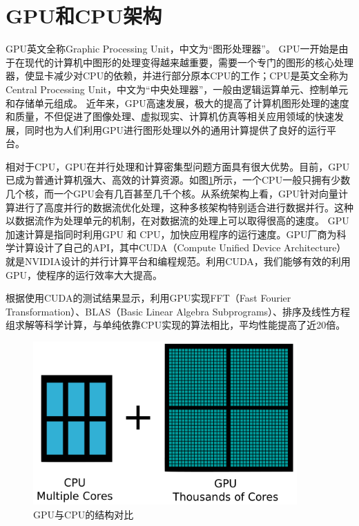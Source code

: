 {\section{GPU和CPU架构}            \label{section:GPU_CPU}
GPU英文全称Graphic Processing Unit，中文为“图形处理器”。
GPU一开始是由于在现代的计算机中图形的处理变得越来越重要，需要一个专门的图形的核心处理器，使显卡减少对CPU的依赖，并进行部分原本CPU的工作；CPU是英文全称为Central Processing Unit，中文为“中央处理器”，一般由逻辑运算单元、控制单元和存储单元组成。
近年来，GPU高速发展，极大的提高了计算机图形处理的速度和质量，不但促进了图像处理、虚拟现实、计算机仿真等相关应用领域的快速发展，同时也为人们利用GPU进行图形处理以外的通用计算提供了良好的运行平台。

相对于CPU，GPU在并行处理和计算密集型问题方面具有很大优势。目前，GPU已成为普通计算机强大、高效的计算资源。如图\ref{fig:GPU}所示，一个CPU一般只拥有少数几个核，而一个GPU会有几百甚至几千个核。从系统架构上看，GPU针对向量计算进行了高度并行的数据流优化处理，这种多核架构特别适合进行数据并行。这种以数据流作为处理单元的机制，在对数据流的处理上可以取得很高的速度。
GPU 加速计算是指同时利用GPU 和 CPU，加快应用程序的运行速度\cite{gpu2008}。GPU厂商为科学计算设计了自己的API，其中CUDA（Compute Unified Device Architecture）就是NVIDIA设计的并行计算平台和编程规范\cite{nvidia2010programming}。利用CUDA，我们能够有效的利用GPU，使程序的运行效率大大提高。

根据使用CUDA的测试结果显示，利用GPU实现FFT（Fast Fourier Transformation）、BLAS（Basic Linear Algebra Subprograms）、排序及线性方程组求解等科学计算，与单纯依靠CPU实现的算法相比，平均性能提高了近20倍。
\begin{figure}[!htb]
    \centering
    \includegraphics[width=0.9\textwidth]{plot/GPU_vs_CPU.png}
    \caption{GPU与CPU的结构对比}
    \label{fig:GPU}
\end{figure}

}
